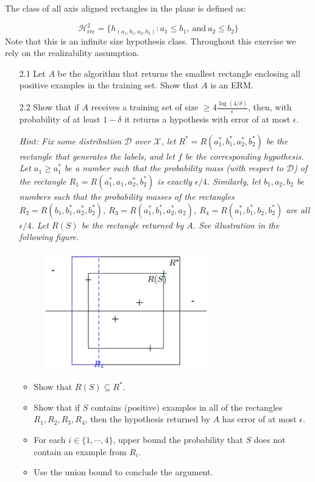 \documentclass{article}
\begin{document}
\begin{itemize}
	The class of all axis aligned rectangles in the plane is defined as:
	
	\begin{equation*}
	\mathcal{H}^2_{\mathrm{rec}}=\{h_{(a_1,b_1,a_2,b_2)}:a_1\leq b_1,\ \mathrm{and}\ a_2\leq b_2\}
	\end{equation*}
Note that this is an infinite size hypothesis class. Throughout this exercise we rely on the realizability assumption.

	\begin{itemize}
	\item[2.1] Let $A$ be the algorithm that returns the smallest rectangle enclosing all positive examples in the training set. Show that $A$ is an ERM.
	\item[2.2] Show that if $A$ receives a training set of size $\geq 4\frac{\log(4/\delta)}{\epsilon}$, then, with probability of at least $1-\delta$ it returns a hypothesis with error of at most $\epsilon$.
	
	\textit{Hint: Fix some distribution $\mathcal{D}$ over $\mathcal{X}$, let $R^*=R(a^*_1,b^*_1,a^*_2,b^*_2)$ be the rectangle that generates the labels, and let $f$ be the corresponding hypothesis. Let $a_1\geq a^*_1$ be a number such that the probability mass (with respect to $\mathcal{D}$) of the rectangle $R_1=R(a^*_1,a_1,a^*_2,b^*_2)$ is exactly $\epsilon/4$. Similarly, let $b_1,a_2,b_2$ be numbers such that the probability masses of the rectangles $R_2=R(b_1,b^*_1,a^*_2,b^*_2)$, $R_3=R(a^*_1,b^*_1,a^*_2,a_2)$, $R_4=R(a^*_1,b^*_1,b_2,b^*_2)$ are all $\epsilon/4$. Let $R(S)$ be the rectangle returned by $A$. See illustration in the following figure.}
	
	\begin{figure}[!htbp]
	\center
	\includegraphics[scale=.8]{1.png}
	\end{figure}
	
	\begin{itemize}
	\item Show that $R(S)\subseteq R^*$.
	\item Show that if $S$ contains (positive) examples in all of the rectangles $R_1,R_2,R_3,R_4$, then the hypothesis returned by $A$ has error of at most $\epsilon$.
	\item For each $i\in\{1,\cdots,4\}$, upper bound the probability that $S$ does not contain an example from $R_i$.
	\item Use the union bound to conclude the argument.
	\end{itemize}
	 

\end{itemize}
\end{itemize}
\end{document}
